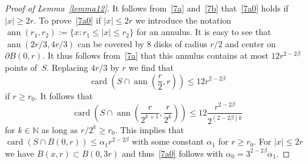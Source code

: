 \documentclass[12pt,a4paper]{amsart}
\theoremstyle{plain}
\theoremstyle{definition}
\theoremstyle{remark}
\def\N{\mathbb N}
\def\card{\operatorname{card}}
\def\ann{\operatorname{ann}}
\numberwithin{equation}{section}
\begin{document}
\begin{proof}[Proof of Lemma~\ref{lemma12}]
It follows from~\eqref{7a} and~\eqref{7b} that~\eqref{7a0} holds if $|x|\geq 2r$.
To prove~\eqref{7a0} if $|x|\leq 2r$ we introduce the notation
$\ann(r_1,r_2):=\{x\colon r_1\leq |x|\leq r_2\}$ for an annulus.
It is easy to see that $\ann(2r/3,4r/3)$ can be covered by $8$ disks
of radius $r/2$ and center on $\partial B(0,r)$. 
It thus follows from~\eqref{7a} that this annulus contains at most 
$12r^{2-2\beta}$ points of~$S$.
Replacing $4r/3$ by $r$ we find that 
\begin{equation}\label{7q}
\card\!\left(S\cap \ann\!\left(\frac{r}{2},r\right) \right)\leq 12 r^{2-2\beta}
\end{equation}
if $r\geq r_0$.
It follows that 
\begin{equation}\label{7r}
\card\!\left(S\cap \ann\!\left(\frac{r}{2^{k+1}},\frac{r}{2^{k}}\right) \right)\leq 12 
\frac{r^{2-2\beta}}{2^{(2-2\beta)k}}
\end{equation}
for $k\in\N$ as long as $r/2^{k}\geq r_0$.
This implies that $\card(S\cap B(0,r))\leq \alpha_1 r^{2-2\beta}$ with some constant
$\alpha_1$ for $r\geq r_0$.
For $|x|\leq 2r$ we have $B(x,r)\subset B(0,3r)$ and thus~\eqref{7a0} follows 
with $\alpha_0=3^{2-2\beta}\alpha_1$.
\end{proof} 
\end{document}
